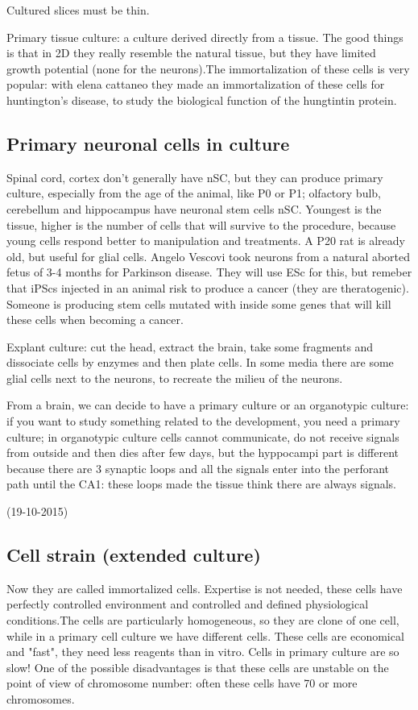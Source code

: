 \documentclass[a4paper, 12pt]{book}
\begin{document}
Cultured slices must be thin. 

Primary tissue culture: a culture derived directly from a tissue. The good things is that in 2D they really resemble the natural tissue, but they have limited growth potential (none for the neurons).The immortalization of these cells is very popular: with elena cattaneo they made an immortalization of these cells for huntington's disease, to study the biological function of the hungtintin protein.

\subsection{Primary neuronal cells in culture} 
Spinal cord, cortex don't generally have nSC, but they can produce primary culture, especially from the age of the animal, like P0 or P1; olfactory bulb, cerebellum and hippocampus have neuronal stem cells nSC. Youngest is the tissue, higher is the number of cells that will survive to the procedure, because young cells respond better to manipulation and treatments. A P20 rat is already old, but useful for glial cells. Angelo Vescovi took neurons from a natural aborted fetus of 3-4 months for Parkinson disease. They will use ESc for this, but remeber that iPScs injected in an animal risk to produce a cancer (they are theratogenic). Someone is producing stem cells mutated with inside some genes that will kill these cells when becoming a cancer.

Explant culture: cut the head, extract the brain, take some fragments and dissociate cells by enzymes and then plate cells. In some media there are some glial cells next to the neurons, to recreate the milieu of the neurons.

From a brain, we can decide to have a primary culture or an organotypic culture: if you want to study something related to the development, you need a primary culture; in organotypic culture cells cannot communicate, do not receive signals from outside and then dies after few days, but the hyppocampi part is different because there are 3 synaptic loops and all the signals enter into the perforant path until the CA1: these loops made the tissue think there are always signals.

(19-10-2015)

\subsection{Cell strain (extended culture)}
 Now they are called immortalized cells.  Expertise is not needed, these cells have perfectly controlled environment and controlled and defined physiological conditions.The cells are particularly homogeneous, so they are clone of one cell, while in a primary cell culture we have different cells. These cells are economical and "fast", they need less reagents than in vitro. Cells in primary culture are so slow! One of the possible disadvantages is that these cells are unstable on the point of view of chromosome number: often these cells have 70 or more chromosomes. 
\\
\end{document}
